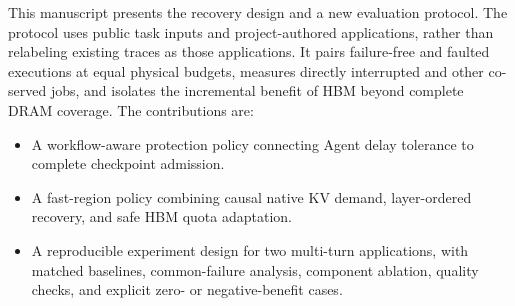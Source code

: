 This manuscript presents the recovery design and a new evaluation
protocol. The protocol uses public task inputs and project-authored
applications, rather than relabeling existing traces as those applications.
It pairs failure-free and faulted executions at equal physical budgets,
measures directly interrupted and other co-served jobs, and isolates the
incremental benefit of HBM beyond complete DRAM coverage. The contributions
are:
\begin{itemize}
\item A workflow-aware protection policy connecting Agent delay tolerance
to complete checkpoint admission.
\item A fast-region policy combining causal native KV demand, layer-ordered
recovery, and safe HBM quota adaptation.
\item A reproducible experiment design for two multi-turn applications,
with matched baselines, common-failure analysis, component ablation,
quality checks, and explicit zero- or negative-benefit cases.
\end{itemize}
